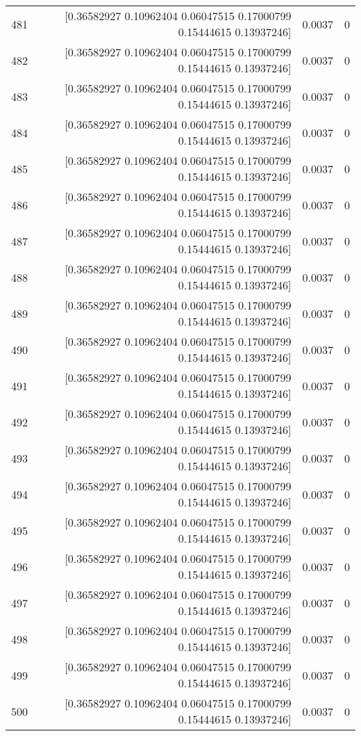 \begin{longtable}{lrrr}
481 & [0.36582927 0.10962404 0.06047515 0.17000799 0.15444615 0.13937246] & 0.0037 & 0 \\
482 & [0.36582927 0.10962404 0.06047515 0.17000799 0.15444615 0.13937246] & 0.0037 & 0 \\
483 & [0.36582927 0.10962404 0.06047515 0.17000799 0.15444615 0.13937246] & 0.0037 & 0 \\
484 & [0.36582927 0.10962404 0.06047515 0.17000799 0.15444615 0.13937246] & 0.0037 & 0 \\
485 & [0.36582927 0.10962404 0.06047515 0.17000799 0.15444615 0.13937246] & 0.0037 & 0 \\
486 & [0.36582927 0.10962404 0.06047515 0.17000799 0.15444615 0.13937246] & 0.0037 & 0 \\
487 & [0.36582927 0.10962404 0.06047515 0.17000799 0.15444615 0.13937246] & 0.0037 & 0 \\
488 & [0.36582927 0.10962404 0.06047515 0.17000799 0.15444615 0.13937246] & 0.0037 & 0 \\
489 & [0.36582927 0.10962404 0.06047515 0.17000799 0.15444615 0.13937246] & 0.0037 & 0 \\
490 & [0.36582927 0.10962404 0.06047515 0.17000799 0.15444615 0.13937246] & 0.0037 & 0 \\
491 & [0.36582927 0.10962404 0.06047515 0.17000799 0.15444615 0.13937246] & 0.0037 & 0 \\
492 & [0.36582927 0.10962404 0.06047515 0.17000799 0.15444615 0.13937246] & 0.0037 & 0 \\
493 & [0.36582927 0.10962404 0.06047515 0.17000799 0.15444615 0.13937246] & 0.0037 & 0 \\
494 & [0.36582927 0.10962404 0.06047515 0.17000799 0.15444615 0.13937246] & 0.0037 & 0 \\
495 & [0.36582927 0.10962404 0.06047515 0.17000799 0.15444615 0.13937246] & 0.0037 & 0 \\
496 & [0.36582927 0.10962404 0.06047515 0.17000799 0.15444615 0.13937246] & 0.0037 & 0 \\
497 & [0.36582927 0.10962404 0.06047515 0.17000799 0.15444615 0.13937246] & 0.0037 & 0 \\
498 & [0.36582927 0.10962404 0.06047515 0.17000799 0.15444615 0.13937246] & 0.0037 & 0 \\
499 & [0.36582927 0.10962404 0.06047515 0.17000799 0.15444615 0.13937246] & 0.0037 & 0 \\
500 & [0.36582927 0.10962404 0.06047515 0.17000799 0.15444615 0.13937246] & 0.0037 & 0 \\
\end{longtable}